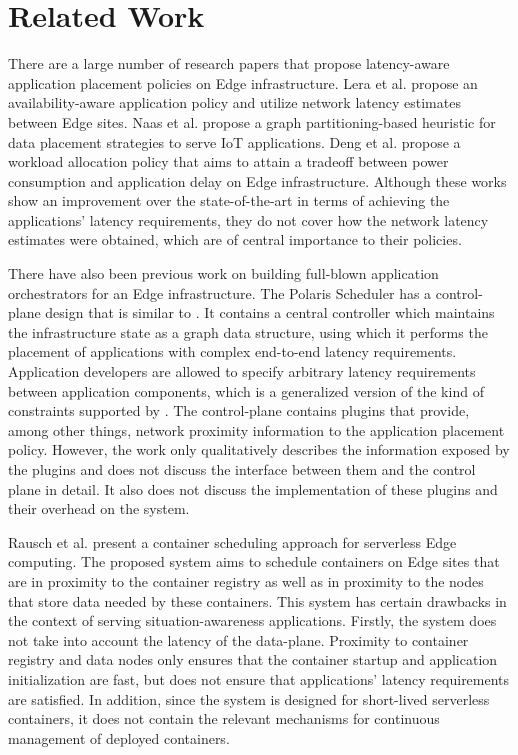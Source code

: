 \section{Related Work}
\label{sec:oneedge_related_work}
\par There are a large number of research papers that propose latency-aware application placement policies on Edge infrastructure. Lera et al. \cite{lera2018availability} propose an availability-aware application policy and utilize network latency estimates between Edge sites. Naas et al. \cite{naas2018graph} propose a graph partitioning-based heuristic for data placement strategies to serve IoT applications. Deng et al.\cite{deng2015towards} propose a workload allocation policy that aims to attain a tradeoff between power consumption and application delay on Edge infrastructure. Although these works show an improvement over the state-of-the-art in terms of achieving the applications' latency requirements, they do not cover how the network latency estimates were obtained, which are of central importance to their policies.
\par There have also been previous work on building full-blown application orchestrators for an Edge infrastructure. The Polaris Scheduler \cite{nastic2021polaris} has a control-plane design that is similar to \oneedge{}. It contains a central controller which maintains the infrastructure state as a graph data structure, using which it performs the placement of applications with complex end-to-end latency requirements. Application developers are allowed to specify arbitrary latency requirements between application components, which is a generalized version of the kind of constraints supported by \oneedge{}. The control-plane contains plugins that provide, among other things, network proximity information to the application placement policy. However, the work only qualitatively describes the information exposed by the plugins and does not discuss the interface between them and the control plane in detail. It also does not discuss the implementation of these plugins and their overhead on the system.
\par Rausch et al. \cite{rausch2021optimized} present a container scheduling approach for serverless Edge computing. The proposed system aims to schedule containers on Edge sites that are in proximity to the container registry as well as in proximity to the nodes that store data needed by these containers. This system has certain drawbacks in the context of serving situation-awareness applications. Firstly, the system does not take into account the latency of the data-plane. Proximity to container registry and data nodes only ensures that the container startup and application initialization are fast, but does not ensure that applications' latency requirements are satisfied. In addition, since the system is designed for short-lived serverless containers, it does not contain the relevant mechanisms for continuous management of deployed containers.
